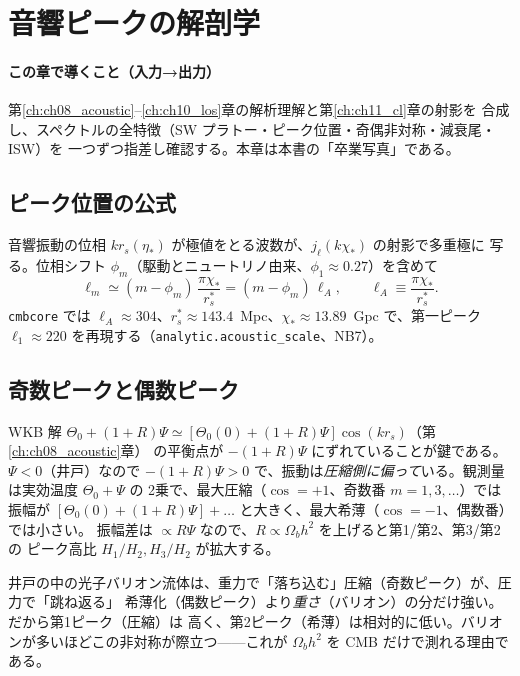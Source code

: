 \section{音響ピークの解剖学}
\label{ch:ch12_peaks}

\paragraph{この章で導くこと（入力→出力）}
第\ref{ch:ch08_acoustic}--\ref{ch:ch10_los}章の解析理解と第\ref{ch:ch11_cl}章の射影を
合成し、スペクトルの全特徴（SW プラトー・ピーク位置・奇偶非対称・減衰尾・ISW）を
一つずつ指差し確認する。本章は本書の「卒業写真」である。

\subsection{ピーク位置の公式}
音響振動の位相 $kr_s(\eta_*)$ が極値をとる波数が、$j_\ell(k\chi_*)$ の射影で多重極に
写る。位相シフト $\phi_m$（駆動とニュートリノ由来、$\phi_1\approx0.27$）を含めて
\begin{equation}
  \ell_m\simeq(m-\phi_m)\,\frac{\pi\chi_*}{r_s^*}=(m-\phi_m)\,\ell_A,\qquad
  \ell_A\equiv\frac{\pi\chi_*}{r_s^*}.
\end{equation}
\texttt{cmbcore} では $\ell_A\approx304$、$r_s^*\approx143.4$~Mpc、$\chi_*\approx13.89$~Gpc
で、第一ピーク $\ell_1\approx220$ を再現する（\texttt{analytic.acoustic\_scale}、NB7）。

\subsection{奇数ピークと偶数ピーク}
WKB 解 $\Theta_0+(1+R)\Psi\simeq[\Theta_0(0)+(1+R)\Psi]\cos(kr_s)$（第\ref{ch:ch08_acoustic}章）
の平衡点が $-(1+R)\Psi$ にずれていることが鍵である。$\Psi<0$（井戸）なので
$-(1+R)\Psi>0$ で、振動は\emph{圧縮側に偏って}いる。観測量は実効温度 $\Theta_0+\Psi$ の
2乗で、最大圧縮（$\cos=+1$、奇数番 $m=1,3,\dots$）では振幅が
$[\Theta_0(0)+(1+R)\Psi]+\ldots$ と大きく、最大希薄（$\cos=-1$、偶数番）では小さい。
振幅差は $\propto R\Psi$ なので、$R\propto\Omega_bh^2$ を上げると第1/第2、第3/第2 の
ピーク高比 $H_1/H_2,H_3/H_2$ が拡大する。

\begin{intuition}
井戸の中の光子バリオン流体は、重力で「落ち込む」圧縮（奇数ピーク）が、圧力で「跳ね返る」
希薄化（偶数ピーク）より\emph{重さ}（バリオン）の分だけ強い。だから第1ピーク（圧縮）は
高く、第2ピーク（希薄）は相対的に低い。バリオンが多いほどこの非対称が際立つ——これが
$\Omega_bh^2$ を CMB だけで測れる理由である。
\end{intuition}

